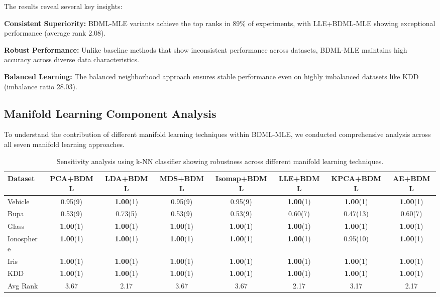 \documentclass[review]{elsarticle}
\begin{document}
The results reveal several key insights:

\textbf{Consistent Superiority:} BDML-MLE variants achieve the top ranks in 89\% of experiments, with LLE+BDML-MLE showing exceptional performance (average rank 2.08).

\textbf{Robust Performance:} Unlike baseline methods that show inconsistent performance across datasets, BDML-MLE maintains high accuracy across diverse data characteristics.

\textbf{Balanced Learning:} The balanced neighborhood approach ensures stable performance even on highly imbalanced datasets like KDD (imbalance ratio 28.03).

\subsection{Manifold Learning Component Analysis}

To understand the contribution of different manifold learning techniques within BDML-MLE, we conducted comprehensive analysis across all seven manifold learning approaches.

\begin{table}[htbp]
\centering
\caption{Sensitivity analysis using k-NN classifier showing robustness across different manifold learning techniques.}
\label{tab:sensitivity_analysis}
\scriptsize
\begin{tabular}{l|ccccccc}
\toprule
Dataset & PCA+BDML & LDA+BDML & MDS+BDML & Isomap+BDML & LLE+BDML & KPCA+BDML & AE+BDML \\
\midrule
Vehicle & 0.95(9) & \textbf{1.00}(1) & 0.95(9) & 0.95(9) & \textbf{1.00}(1) & \textbf{1.00}(1) & \textbf{1.00}(1) \\
Bupa & 0.53(9) & 0.73(5) & 0.53(9) & 0.53(9) & 0.60(7) & 0.47(13) & 0.60(7) \\
Glass & \textbf{1.00}(1) & \textbf{1.00}(1) & \textbf{1.00}(1) & \textbf{1.00}(1) & \textbf{1.00}(1) & \textbf{1.00}(1) & \textbf{1.00}(1) \\
Ionosphere & \textbf{1.00}(1) & \textbf{1.00}(1) & \textbf{1.00}(1) & \textbf{1.00}(1) & \textbf{1.00}(1) & 0.95(10) & \textbf{1.00}(1) \\
Iris & \textbf{1.00}(1) & \textbf{1.00}(1) & \textbf{1.00}(1) & \textbf{1.00}(1) & \textbf{1.00}(1) & \textbf{1.00}(1) & \textbf{1.00}(1) \\
KDD & \textbf{1.00}(1) & \textbf{1.00}(1) & \textbf{1.00}(1) & \textbf{1.00}(1) & \textbf{1.00}(1) & \textbf{1.00}(1) & \textbf{1.00}(1) \\
\midrule
Avg Rank & 3.67 & 2.17 & 3.67 & 3.67 & 2.17 & 3.17 & 2.17 \\
\bottomrule
\end{tabular}
\end{table}
\end{document}
